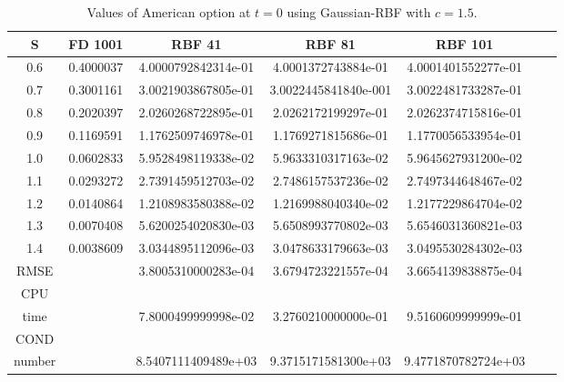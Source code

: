 \documentclass[12pt]{article}
\numberwithin{equation}{subsection} %
\begin{document}
\begin{table}[h]
\centering
 \caption{Values of American option at $t=0$ using Gaussian-RBF with $c=1.5$.}
 \vspace{5mm}
\begin{tabular}{|c|c|c|c|c|c|c|}
  \hline
  S & FD 1001  & RBF 41 & RBF 81 & RBF 101 \\
  \hline
  0.6 & 0.4000037 &     4.0000792842314e-01 & 4.0001372743884e-01 & 4.0001401552277e-01 \\
  0.7 & 0.3001161  &3.0021903867805e-01  &3.0022445841840e-001 & 3.0022481733287e-01\\
  0.8 & 0.2020397  & 2.0260268722895e-01 & 2.0262172199297e-01 &  2.0262374715816e-01\\
  0.9 & 0.1169591  & 1.1762509746978e-01 & 1.1769271815686e-01 &   1.1770056533954e-01\\
  1.0 & 0.0602833  & 5.9528498119338e-02 & 5.9633310317163e-02 &  5.9645627931200e-02 \\
  1.1 & 0.0293272  & 2.7391459512703e-02 &  2.7486157537236e-02 &   2.7497344648467e-02\\
  1.2 & 0.0140864  & 1.2108983580388e-02  &  1.2169988040340e-02 & 1.2177229864704e-02 \\
  1.3 & 0.0070408  &5.6200254020830e-03   &  5.6508993770802e-03 & 5.6546031360821e-03 \\
  1.4 & 0.0038609  &3.0344895112096e-03& 3.0478633179663e-03 &  3.0495530284302e-03\\
  \hline
  RMSE &   &3.8005310000283e-04  &  3.6794723221557e-04 &  3.6654139838875e-04 \\
  \hline
  CPU &   &  &  &  \\
  time  &   & 7.8000499999998e-02 & 3.2760210000000e-01 & 9.5160609999999e-01 \\
  \hline
   COND &   &  &  &  \\
  number  &   & 8.5407111409489e+03 &  9.3715171581300e+03& 9.4771870782724e+03 \\
  \hline
\end{tabular}

\end{table}
\end{document}
